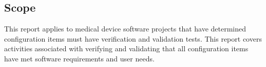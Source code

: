 \subsection{Scope}
This report applies to \stdCompanyName{} medical device software projects that
have determined configuration items must have verification and validation tests.
This report covers activities associated with verifying and validating that all
configuration items have met software requirements and user needs.
